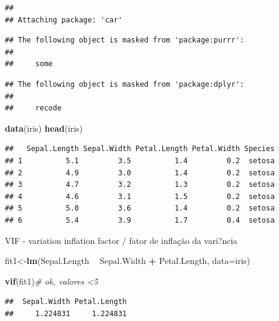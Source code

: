 \documentclass[
]{book}
\newenvironment{Shaded}{\begin{snugshade}}{\end{snugshade}}
\newcommand{\CommentTok}[1]{\textcolor[rgb]{0.56,0.35,0.01}{\textit{#1}}}
\newcommand{\DataTypeTok}[1]{\textcolor[rgb]{0.13,0.29,0.53}{#1}}
\newcommand{\KeywordTok}[1]{\textcolor[rgb]{0.13,0.29,0.53}{\textbf{#1}}}
\newcommand{\NormalTok}[1]{#1}
\newcommand{\OperatorTok}[1]{\textcolor[rgb]{0.81,0.36,0.00}{\textbf{#1}}}
\newcommand{\StringTok}[1]{\textcolor[rgb]{0.31,0.60,0.02}{#1}}
\begin{document}
\begin{verbatim}
## 
## Attaching package: 'car'
\end{verbatim}

\begin{verbatim}
## The following object is masked from 'package:purrr':
## 
##     some
\end{verbatim}

\begin{verbatim}
## The following object is masked from 'package:dplyr':
## 
##     recode
\end{verbatim}

\begin{Shaded}
\begin{Highlighting}[]
\KeywordTok{data}\NormalTok{(iris)}
\KeywordTok{head}\NormalTok{(iris)}
\end{Highlighting}
\end{Shaded}

\begin{verbatim}
##   Sepal.Length Sepal.Width Petal.Length Petal.Width Species
## 1          5.1         3.5          1.4         0.2  setosa
## 2          4.9         3.0          1.4         0.2  setosa
## 3          4.7         3.2          1.3         0.2  setosa
## 4          4.6         3.1          1.5         0.2  setosa
## 5          5.0         3.6          1.4         0.2  setosa
## 6          5.4         3.9          1.7         0.4  setosa
\end{verbatim}

VIF - variation inflation factor / fator de inflação da vari?ncia

\begin{Shaded}
\begin{Highlighting}[]
\NormalTok{fit1<-}\KeywordTok{lm}\NormalTok{(Sepal.Length }\OperatorTok{~}\StringTok{ }\NormalTok{Sepal.Width }\OperatorTok{+}\StringTok{ }\NormalTok{Petal.Length, }\DataTypeTok{data=}\NormalTok{iris)}
\end{Highlighting}
\end{Shaded}

\begin{Shaded}
\begin{Highlighting}[]
\KeywordTok{vif}\NormalTok{(fit1)}\CommentTok{# ok, valores <5}
\end{Highlighting}
\end{Shaded}

\begin{verbatim}
##  Sepal.Width Petal.Length 
##     1.224831     1.224831
\end{verbatim}
\end{document}
